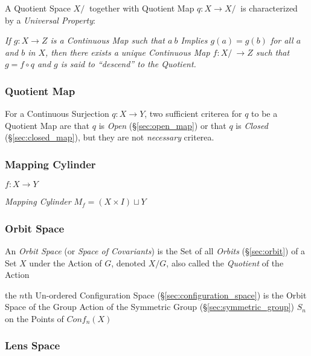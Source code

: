 A Quotient Space $X/~$ together with Quotient Map $q : X \rightarrow X/~$ is
characterized by a \emph{Universal Property}:

\emph{If $g : X \rightarrow Z$ is a Continuous Map such that $a ~ b$ Implies $g(a)
  = g(b)$ for all $a$ and $b$ in $X$, then there exists a unique Continuous Map
  $f : X/~ \rightarrow Z$ such that $g = f \circ q$ and $g$ is said to
  ``descend'' to the Quotient.}



\subsubsection{Quotient Map}\label{sec:quotient_map}

For a Continuous Surjection $q : X \rightarrow Y$, two sufficient criterea for
$q$ to be a Quotient Map are that $q$ is \emph{Open} (\S\ref{sec:open_map}) or
that $q$ is \emph{Closed} (\S\ref{sec:closed_map}), but they are not
\emph{necessary} criterea.



\subsubsection{Mapping Cylinder}\label{sec:mapping_cylinder}

$f : X \rightarrow Y$

\emph{Mapping Cylinder} $M_f = (X \times I) \sqcup Y$



\subsubsection{Orbit Space}\label{sec:orbit_space}

An \emph{Orbit Space} (or \emph{Space of Covariants}) is the Set of all
\emph{Orbits} (\S\ref{sec:orbit}) of a Set $X$ under the Action of $G$, denoted
$X / G$, also called the \emph{Quotient} of the Action

the $n$th Un-ordered Configuration Space (\S\ref{sec:configuration_space}) is
the Orbit Space of the Group Action of the Symmetric Group
(\S\ref{sec:symmetric_group}) $S_n$ on the Points of $Conf_n(X)$



\subsubsection{Lens Space}\label{sec:lens_space}




